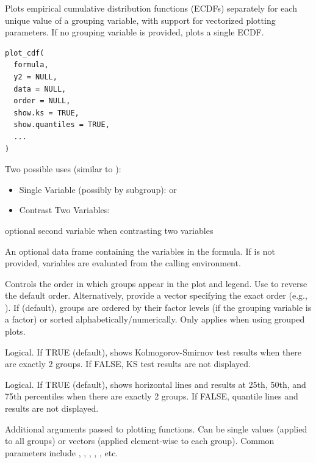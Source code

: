 \documentclass[a4paper]{book}
\begin{document}
%
\begin{Description}
Plots empirical cumulative distribution functions (ECDFs) separately for
each unique value of a grouping variable, with support for vectorized
plotting parameters. If no grouping variable is provided, plots a single ECDF.
\end{Description}
%
\begin{Usage}
\begin{verbatim}
plot_cdf(
  formula,
  y2 = NULL,
  data = NULL,
  order = NULL,
  show.ks = TRUE,
  show.quantiles = TRUE,
  ...
)
\end{verbatim}
\end{Usage}
%
\begin{Arguments}
\begin{ldescription}
\item[\code{formula}] Two possible uses (similar to ):
\begin{itemize}

\item{} Single Variable (possibly by subgroup):  or 
\item{} Contrast Two Variables: 

\end{itemize}


\item[\code{y2}] optional second variable when contrasting two variables 

\item[\code{data}] An optional data frame containing the variables in the formula.
If  is not provided, variables are evaluated from the calling environment.

\item[\code{order}] Controls the order in which groups appear in the plot and legend. 
Use  to reverse the default order. Alternatively, provide a vector specifying
the exact order (e.g., ). If  (default), groups are 
ordered by their factor levels (if the grouping variable is a factor) or sorted 
alphabetically/numerically. Only applies when using grouped plots.

\item[\code{show.ks}] Logical. If TRUE (default), shows Kolmogorov-Smirnov test results
when there are exactly 2 groups. If FALSE, KS test results are not displayed.

\item[\code{show.quantiles}] Logical. If TRUE (default), shows horizontal lines and results
at 25th, 50th, and 75th percentiles when there are exactly 2 groups. If FALSE,
quantile lines and results are not displayed.

\item[\code{...}] Additional arguments passed to plotting functions. Can be single values
(applied to all groups) or vectors (applied element-wise to each group).
Common parameters include , , , ,
, etc.
\end{ldescription}
\end{Arguments}
\end{document}
